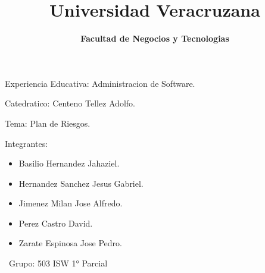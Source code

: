 \documentclass[40pt]{article}
\title{\textbf{Universidad Veracruzana} }
\date{\textbf{Facultad de Negocios y Tecnologias} }
\begin{document}
\maketitle
\textsf{\Large Experiencia Educativa: Administracion de Software. \\}
 
\maketitle
\textsf{\Large Catedratico: Centeno Tellez Adolfo. \\}

\maketitle
\textsf{\Large Tema: Plan de Riesgos. \\}

\maketitle
\textsf{\Large Integrantes: \\}
\begin{itemize}
    \item Basilio Hernandez Jahaziel.
    \item Hernandez Sanchez Jesus Gabriel.
    \item Jimenez Milan Jose Alfredo.
    \item Perez Castro David.
    \item Zarate Espinosa Jose Pedro.   
\end{itemize}

\maketitle
\textsf{\ Grupo: 503 ISW 1° Parcial \\}
\end{document}
